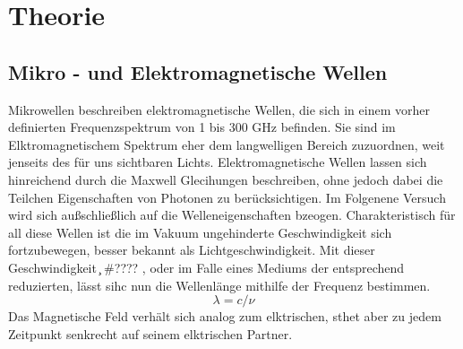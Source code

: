 \section{Theorie}

\subsection{Mikro - und Elektromagnetische Wellen }
Mikrowellen beschreiben elektromagnetische Wellen, die sich in einem vorher definierten Frequenzspektrum von 1 bis 300 \si{\giga\hertz} befinden. 
Sie sind im Elktromagnetischem Spektrum eher dem langwelligen Bereich zuzuordnen, weit jenseits des für uns sichtbaren Lichts.
Elektromagnetische Wellen lassen sich hinreichend durch die Maxwell Glecihungen beschreiben, ohne jedoch dabei die Teilchen Eigenschaften von Photonen zu berücksichtigen. Im Folgenene Versuch wird sich außschließlich auf die Welleneigenschaften bzeogen.
Charakteristisch für all diese Wellen ist die im Vakuum ungehinderte Geschwindigkeit sich fortzubewegen, besser bekannt als Lichtgeschwindigkeit. 
Mit dieser Geschwindigkeit \si{\c} #????
, oder im Falle eines Mediums der entsprechend reduzierten, lässt sihc nun die Wellenlänge mithilfe der Frequenz \si{\nu} bestimmen.
\begin{equation}
\lambda = c/{\nu}
\end{equation}
Das Magnetische Feld verhält sich analog zum elktrischen, sthet aber zu jedem Zeitpunkt senkrecht auf seinem elktrischen Partner. 